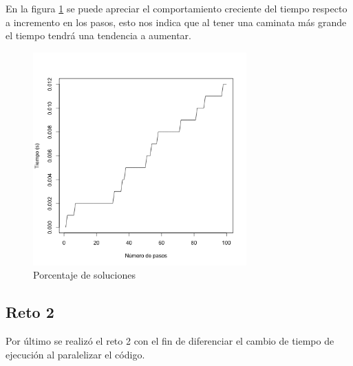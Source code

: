\documentclass[12pt, letterpaper] {article}
\begin{document}
En la figura \ref{PSol} se puede apreciar el comportamiento creciente del tiempo respecto a incremento en los pasos, esto nos indica que al tener una caminata más grande el tiempo tendrá una tendencia a aumentar. 

\begin{figure}[H]
\centering\includegraphics[width=82mm]{tiempo.png}
\caption{Porcentaje de soluciones}
\label{PSol}
\end{figure}


\subsection{Reto 2}

Por último se realizó el reto 2 con el fin de diferenciar el cambio de tiempo de ejecución al paralelizar el código. 
\end{document}

